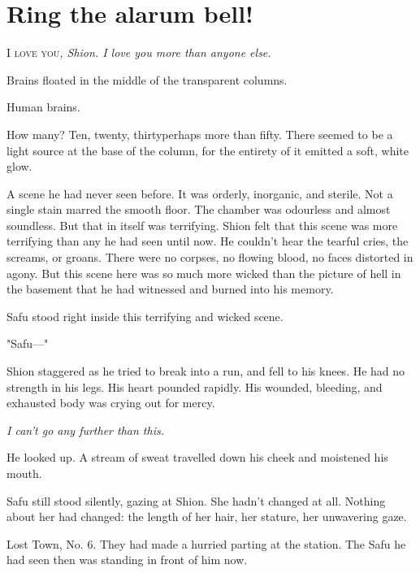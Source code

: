 
\chapter{Ring the alarum bell!}


\lettrine{I}{ love you}\emph{, Shion. I love you more than anyone else.}

\myspace

Brains floated in the middle of the transparent columns.

Human brains.

How many? Ten, twenty, thirty\el perhaps more than fifty. There seemed
to be a light source at the base of the column, for the entirety of it
emitted a soft, white glow.

A scene he had never seen before. It was orderly, inorganic, and
sterile. Not a single stain marred the smooth floor. The chamber was
odourless and almost soundless. But that in itself was terrifying. Shion
felt that this scene was more terrifying than any he had seen until now.
He couldn't hear the tearful cries, the screams, or groans. There were
no corpses, no flowing blood, no faces distorted in agony. But this
scene here was so much more wicked than the picture of hell in the
basement that he had witnessed and burned into his memory.

Safu stood right inside this terrifying and wicked scene.

"Safu---"

Shion staggered as he tried to break into a run, and fell to his knees.
He had no strength in his legs. His heart pounded rapidly. His wounded,
bleeding, and exhausted body was crying out for mercy.

\emph{I can't go any further than this.}

He looked up. A stream of sweat travelled down his cheek and moistened
his mouth.

Safu still stood silently, gazing at Shion. She hadn't changed at all.
Nothing about her had changed: the length of her hair, her stature, her
unwavering gaze.

Lost Town, No. 6. They had made a hurried parting at the station. The
Safu he had seen then was standing in front of him now.

